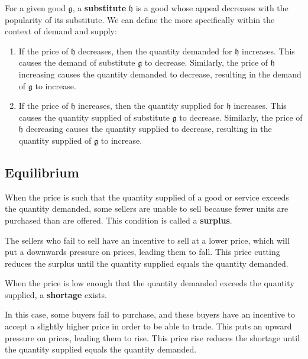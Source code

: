\documentclass{article}
\begin{document}
      \begin{definition}[Substitutes]
        For a given good $\mathfrak{g}$, a \textbf{substitute} $\mathfrak{h}$ is a good whose appeal decreases with the popularity of its substitute. We can define the more specifically within the context of demand and supply: 
        \begin{enumerate}
          \item If the price of $\mathfrak{h}$ decreases, then the quantity demanded for $\mathfrak{h}$ increases. This causes the demand of substitute $\mathfrak{g}$ to decrease. Similarly, the price of $\mathfrak{h}$ increasing causes the quantity demanded to decrease, resulting in the demand of $\mathfrak{g}$ to increase. 
          \item If the price of $\mathfrak{h}$ increases, then the quantity supplied for $\mathfrak{h}$ increases. This causes the quantity supplied of substitute $\mathfrak{g}$ to decrease. Similarly, the price of $\mathfrak{h}$ decreasing causes the quantity supplied to decrease, resulting in the quantity supplied of $\mathfrak{g}$ to increase. 
        \end{enumerate}
      \end{definition}

  \subsection{Equilibrium}

    \begin{definition}[Surplus]
      When the price is such that the quantity supplied of a good or service exceeds the quantity demanded, some sellers are unable to sell because fewer units are purchased than are offered. This condition is called a \textbf{surplus}. 

      The sellers who fail to sell have an incentive to sell at a lower price, which will put a downwards pressure on prices, leading them to fall. This price cutting reduces the surplus until the quantity supplied equals the quantity demanded. 
    \end{definition}

    \begin{definition}[Shortage]
      When the price is low enough that the quantity demanded exceeds the quantity supplied, a \textbf{shortage} exists. 

      In this case, some buyers fail to purchase, and these buyers have an incentive to accept a slightly higher price in order to be able to trade. This puts an upward pressure on prices, leading them to rise. This price rise reduces the shortage until the quantity supplied equals the quantity demanded. 
    \end{definition}
\end{document}

